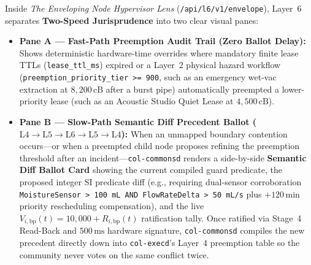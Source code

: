 Inside \textit{The Enveloping Node Hypervisor Lens} (\texttt{/api/l6/v1/envelope}), Layer~6 separates \textbf{Two-Speed Jurisprudence} into two clear visual panes:
\begin{itemize}
    \item \textbf{Pane A --- Fast-Path Preemption Audit Trail (Zero Ballot Delay):} Shows deterministic hardware-time overrides where mandatory finite lease TTLs (\texttt{lease\_ttl\_ms}) expired or a Layer~2 physical hazard workflow (\texttt{preemption\_priority\_tier >= 900}, such as an emergency wet-vac extraction at $8{,}200\,\mathrm{cB}$ after a burst pipe) automatically preempted a lower-priority lease (such as an Acoustic Studio Quiet Lease at $4{,}500\,\mathrm{cB}$).
    \item \textbf{Pane B --- Slow-Path Semantic Diff Precedent Ballot ($\mathrm{L4} \to \mathrm{L5} \to \mathrm{L6} \to \mathrm{L5} \to \mathrm{L4}$):} When an unmapped boundary contention occurs---or when a preempted child node proposes refining the preemption threshold after an incident---\texttt{col-commonsd} renders a side-by-side \textbf{Semantic Diff Ballot Card} showing the current compiled guard predicate, the proposed integer SI predicate diff (e.g., requiring dual-sensor corroboration \texttt{MoistureSensor > 100 mL AND FlowRateDelta > 50 mL/s} plus $+120\,\mathrm{min}$ priority rescheduling compensation), and the live $V_{i,\mathrm{bp}}(t) = 10{,}000 + R_{i,\mathrm{bp}}(t)$ ratification tally. Once ratified via Stage~4 Read-Back and $500\,\mathrm{ms}$ hardware signature, \texttt{col-commonsd} compiles the new precedent directly down into \texttt{col-execd}'s Layer~4 preemption table so the community never votes on the same conflict twice.
\end{itemize}

